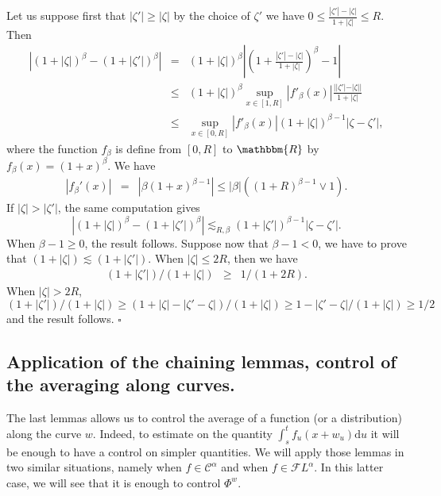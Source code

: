 \documentclass[a4paper,11pt]{article}
\newcommand{\mathd}{\mathrm{d}}
\newenvironment{proof}{{\sc Proof.}}{\hfill$\square$}
\newcommand{\CC}{\mathscr C}
\newcommand{\CF}{\mathscr F}
\begin{document}
\begin{proof}
  Let us suppose first that $| \zeta' | \geqslant | \zeta |$ by the choice of
  $\zeta'$ we have $0 \leqslant \frac{| \zeta' | - | \zeta |}{1+ | \zeta |}
  \leqslant R$. Then
  \begin{eqnarray*}
    | ( 1+ | \zeta | )^{\beta} - ( 1+ | \zeta' | )^{\beta} | & = & ( 1+ |
    \zeta | )^{\beta} \left\lvert \left( 1+ \frac{| \zeta' | - | \zeta |}{1+ |
    \zeta |} \right)^{\beta} -1 \right\lvert\\
    & \leqslant & ( 1+ | \zeta | )^{\beta} \sup_{x \in [ 1,R ]} | f'_{\beta}
    ( x ) | \frac{| | \zeta' | - | \zeta | |}{1+ | \zeta |}\\
    & \leqslant & \sup_{x \in [ 0,R ]} | f'_{\beta} ( x ) | ( 1+ | \zeta |
    )^{\beta -1} | \zeta - \zeta' |,
  \end{eqnarray*}
  where the function $f_{\beta}$ is define from $[ 0,R ]$ to $\mathbbm{R}$ by
  \ $f_{\beta} ( x ) = ( 1+x )^{\beta}$. We have
  \begin{eqnarray*}
    | f_{\beta}' ( x ) | & = & | \beta ( 1+x )^{\beta -1} | \leqslant | \beta
    | ( ( 1+R )^{\beta -1} \vee 1 ) .
  \end{eqnarray*}
  If $| \zeta | > | \zeta' |$, the same computation gives
  \[ | ( 1+ | \zeta | )^{\beta} - ( 1+ | \zeta' | )^{\beta} | \lesssim_{R,
     \beta} ( 1+ | \zeta' | )^{\beta -1} | \zeta - \zeta' | . \]
  When $\beta -1 \geqslant 0$, the result follows. Suppose now that 
  $\beta-1<0$, we have to prove that $( 1+ | \zeta | ) \lesssim ( 1+ | \zeta' | )$.
  When $| \zeta | \leqslant 2R$, then we have
  \begin{eqnarray*}
    ( 1+ | \zeta' | ) / ( 1+ | \zeta | ) & \geqslant & 1/ ( 1+2R ) .
  \end{eqnarray*}
  When $| \zeta | >2R$,
  \[ ( 1+ | \zeta' | ) / ( 1+ | \zeta | ) \geqslant ( 1+ | \zeta | - | \zeta'
     - \zeta |   ) / ( 1+ | \zeta | ) \geqslant 1- | \zeta' - \zeta | / ( 1+ |
     \zeta | ) \geqslant 1/2 \]
  and the result follows.
\end{proof}

\subsection{Application of the chaining lemmas, control of the averaging along
curves.}

The last lemmas allows us to control the average of a function (or a
distribution) along the curve $w$. Indeed, to estimate on the quantity
$\int_{s}^{t} f_{u} ( x+w_{u} ) \mathd u$ it will be enough to have a control
on simpler quantities. We will apply those lemmas in two similar situations,
namely when $f \in \CC^{\alpha}$ and when $f \in \CF L^{\alpha}$. In this latter
case, we will see that it is enough to control $\Phi^{w}$.
\end{document}
